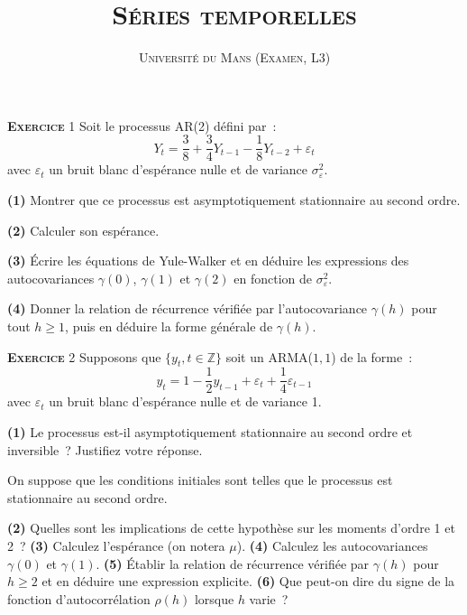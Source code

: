 \documentclass[10pt,a4paper,notitlepage,twocolumn]{article}
\newcommand{\exercice}[1]{\textsc{\textbf{Exercice}} #1}
\newcommand{\question}[1]{\textbf{(#1)}}
\begin{document}
\title{\textsc{Séries temporelles}}
\author{\textsc{Université du Mans (Examen, L3)}}
\date{}


\maketitle

\exercice{1} Soit le processus AR(2) défini par~:
\[
  Y_t = \frac{3}{8} + \frac{3}{4}Y_{t-1} - \frac{1}{8}Y_{t-2} + \varepsilon_t
\]
avec $\varepsilon_t$ un bruit blanc d'espérance nulle et de variance
$\sigma_{\varepsilon}^2$.\newline

\question{1} Montrer que ce processus est asymptotiquement stationnaire
au second ordre.\newline

\question{2} Calculer son espérance.\newline

\question{3} Écrire les équations de Yule-Walker et en déduire les
expressions des autocovariances $\gamma(0)$, $\gamma(1)$ et
$\gamma(2)$ en fonction de $\sigma_{\varepsilon}^2$.\newline

\question{4} Donner la relation de récurrence vérifiée par
l'autocovariance $\gamma(h)$ pour tout $h\geq 1$, puis en déduire la
forme générale de $\gamma(h)$.\newline

\bigskip

\exercice{2} Supposons que $\{y_t,t\in\mathbb Z\}$ soit un ARMA($1,1$)
de la forme~:
\[
y_t = 1 - \frac{1}{2}y_{t-1} + \varepsilon_t + \frac{1}{4} \varepsilon_{t-1}
\]
avec $\varepsilon_t$ un bruit blanc d'espérance nulle et de variance
1.\newline

\question{1} Le processus est-il asymptotiquement stationnaire au
second ordre et inversible~? Justifiez votre réponse.\newline

On suppose que les conditions initiales sont telles que le processus
est stationnaire au second ordre.\newline

\question{2} Quelles sont les implications de cette hypothèse sur les
moments d'ordre 1 et 2~? \question{3} Calculez l'espérance (on notera
$\mu$). \question{4} Calculez les autocovariances $\gamma(0)$ et
$\gamma(1)$. \question{5} Établir la relation de récurrence vérifiée
par $\gamma(h)$ pour $h\geq 2$ et en déduire une expression
explicite. \question{6} Que peut-on dire du signe de la fonction
d'autocorrélation $\rho(h)$ lorsque $h$ varie~?\newline
\end{document}
